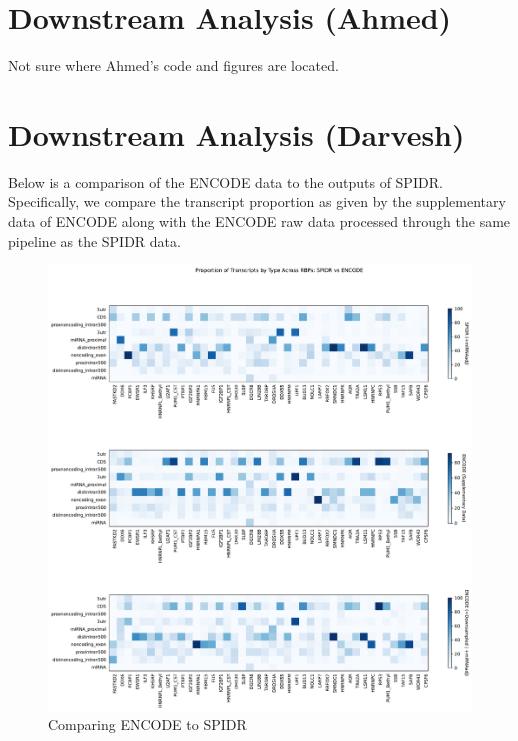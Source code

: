 \documentclass{article}
\begin{document}
    \section{Downstream Analysis (Ahmed)}
    Not sure where Ahmed's code and figures are located.

    \section{Downstream Analysis (Darvesh)}
    Below is a comparison of the ENCODE data to the outputs of SPIDR. Specifically, we compare the transcript proportion as given by the supplementary data of ENCODE along with the ENCODE raw data processed through the same pipeline as the SPIDR data.
    \begin{figure}[ht]
        \centering
        \includegraphics[scale=0.4]{../figures/heatmap_spidr_vs_encode_miRNAadj.pdf}
        \caption[short]{Comparing ENCODE to SPIDR }
    \end{figure}
    
\end{document}
